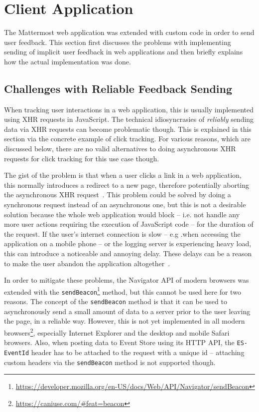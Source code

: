 \section{Client Application}
\label{sec:implementation:client}

The Mattermost web application was extended with custom code in order to send user feedback.
This section first discusses the problems with implementing sending of implicit user feedback in web applications and then briefly explains how the actual implementation was done.

\subsection{Challenges with Reliable Feedback Sending}
\label{subsec:implementation:client:problems}

When tracking user interactions in a web application, this is usually implemented using \ac{XHR} requests in JavaScript.
The technical idiosyncrasies of \emph{reliably} sending data via \ac{XHR} requests can become problematic though.
This is explained in this section via the concrete example of click tracking.
For various reasons, which are discussed below, there are no valid alternatives to doing asynchronous \ac{XHR} requests for click tracking for this use case though.

The gist of the problem is that when a user clicks a link in a web application, this normally introduces a redirect to a new page, therefore potentially aborting the asynchronous \ac{XHR} request~\cite{Kohavi2010}.
This problem could be solved by doing a synchronous request instead of an asynchronous one, but this is not a desirable solution because the whole web application would block -- i.e. not handle any more user actions requiring the execution of JavaScript code -- for the duration of the request.
If the user's internet connection is slow -- e.g .when accessing the application on a mobile phone -- or the logging server is experiencing heavy load, this can introduce a noticeable and annoying delay.
These delays can be a reason to make the user abandon the application altogether~\cite{Kohavi2010,Dmitriev2017}.

In order to mitigate these problems, the Navigator \ac{API} of modern browsers was extended with the \texttt{sendBeacon}\footnote{\url{https://developer.mozilla.org/en-US/docs/Web/API/Navigator/sendBeacon}} method, but this cannot be used here for two reasons.
The concept of the \texttt{sendBeacon} method is that it can be used to asynchronously send a small amount of data to a server prior to the user leaving the page, in a reliable way.
However, this is not yet implemented in all modern browsers\footnote{\url{https://caniuse.com/\#feat=beacon}}, especially Internet Explorer and the desktop and mobile Safari browsers.
Also, when posting data to Event Store using its \ac{HTTP} \ac{API}, the \texttt{ES-EventId} header has to be attached to the request with a unique id -- attaching custom headers via the \texttt{sendBeacon} method is not supported though.

